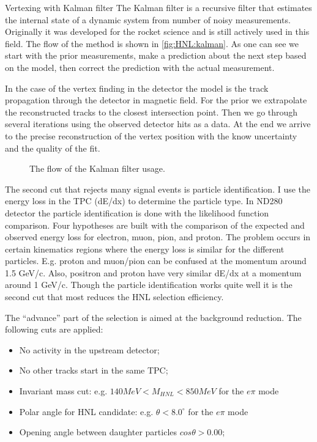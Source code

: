\documentclass[../main.tex]{subfiles}
\begin{document}
\begin{bclogo}[couleur=blue!2, arrondi=0.1, logo=\bcinfo, nobreak=true]{Vertexing with Kalman filter}
    The Kalman filter is a recursive filter that estimates the internal state of a dynamic system from number of noisy measurements. Originally it was developed for the rocket science and is still actively used in this field. The flow of the method is shown in \autoref{fig:HNL:kalman}. As one can see we start with the prior measurements, make a prediction about the next step based on the model, then correct the prediction with the actual measurement.

    In the case of the vertex finding in the detector the model is the track propagation through the detector in magnetic field. For the prior we extrapolate the reconstructed tracks to the closest intersection point. Then we go through several iterations using the observed detector hits as a data. At the end we arrive to the precise reconstruction of the vertex position with the know uncertainty and the quality of the fit.
\end{bclogo}

\begin{figure}[!ht]
  \caption{The flow of the Kalman filter usage.}
  \label{fig:HNL:kalman}
\end{figure}

The second cut that rejects many signal events is particle identification. I use the energy loss in the TPC (dE/dx) to determine the particle type. In ND280 detector the particle identification is done with the likelihood function comparison. Four hypotheses are built with the comparison of the expected and observed energy loss for electron, muon, pion, and proton. The problem occurs in certain kinematics regions where the energy loss is similar for the different particles. E.g. proton and muon/pion can be confused at the momentum around 1.5 GeV/c. Also, positron and proton have very similar dE/dx at a momentum around 1 GeV/c. Though the particle identification works quite well it is the second cut that most reduces the HNL selection efficiency.

The ``advance'' part of the selection is aimed at the background reduction. The following cuts are applied:

\begin{itemize}
  \item No activity in the upstream detector;
  \item No other tracks start in the same TPC;
  \item Invariant mass cut: e.g. $140MeV<M_{HNL}<850MeV$ for the $e\pi$ mode
  \item Polar angle for HNL candidate: e.g. $\theta < 8.0^\circ$ for the $e\pi$ mode
  \item Opening angle between daughter particles $cos\theta >0.00$;
\end{itemize}
\end{document}
